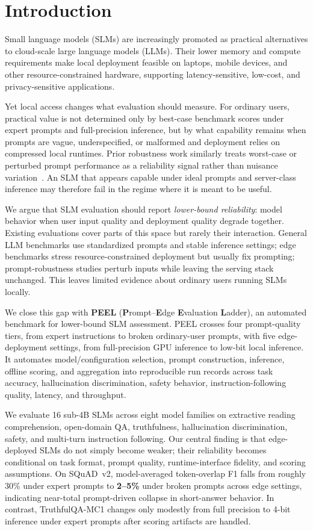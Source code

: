 \documentclass[letterpaper]{article} %
\begin{document}
\section{Introduction}
\label{sec:intro}

Small language models (SLMs) are increasingly promoted as practical alternatives to cloud-scale large language models (LLMs). Their lower memory and compute requirements make local deployment feasible on laptops, mobile devices, and other resource-constrained hardware, supporting latency-sensitive, low-cost, and privacy-sensitive applications.

Yet local access changes what evaluation should measure. For ordinary users, practical value is not determined only by best-case benchmark scores under expert prompts and full-precision inference, but by what capability remains when prompts are vague, underspecified, or malformed and deployment relies on compressed local runtimes. Prior robustness work similarly treats worst-case or perturbed prompt performance as a reliability signal rather than nuisance variation~\cite{zhu2023promptrobust,ralpaca2024}. An SLM that appears capable under ideal prompts and server-class inference may therefore fail in the regime where it is meant to be useful.

We argue that SLM evaluation should report \emph{lower-bound reliability}: model behavior when user input quality and deployment quality degrade together. Existing evaluations cover parts of this space but rarely their interaction. General LLM benchmarks use standardized prompts and stable inference settings; edge benchmarks stress resource-constrained deployment but usually fix prompting; prompt-robustness studies perturb inputs while leaving the serving stack unchanged. This leaves limited evidence about ordinary users running SLMs locally.

We close this gap with \textbf{PEEL} (\textbf{P}rompt--\textbf{E}dge \textbf{E}valuation \textbf{L}adder), an automated benchmark for lower-bound SLM assessment. PEEL crosses four prompt-quality tiers, from expert instructions to broken ordinary-user prompts, with five edge-deployment settings, from full-precision GPU inference to low-bit local inference. It automates model/configuration selection, prompt construction, inference, offline scoring, and aggregation into reproducible run records across task accuracy, hallucination discrimination, safety behavior, instruction-following quality, latency, and throughput.

We evaluate 16 sub-4B SLMs across eight model families on extractive reading comprehension, open-domain QA, truthfulness, hallucination discrimination, safety, and multi-turn instruction following. Our central finding is that edge-deployed SLMs do not simply become weaker; their reliability becomes conditional on task format, prompt quality, runtime-interface fidelity, and scoring assumptions. On SQuAD~v2, model-averaged token-overlap F1 falls from roughly 30\% under expert prompts to \textbf{2--5\%} under broken prompts across edge settings, indicating near-total prompt-driven collapse in short-answer behavior. In contrast, TruthfulQA-MC1 changes only modestly from full precision to 4-bit inference under expert prompts after scoring artifacts are handled.
\end{document}

